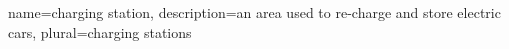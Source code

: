 {
  name={charging station},
  description={an area used to re-charge and store electric cars},
  plural={charging stations}
}

